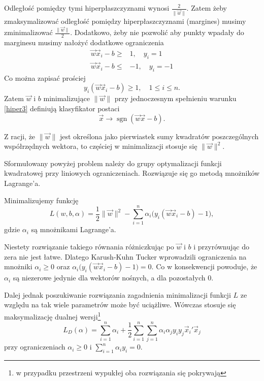 \documentclass[
]{book}
\theoremstyle{plain}
\theoremstyle{definition}
\theoremstyle{definition}
\theoremstyle{definition}
\theoremstyle{definition}
\theoremstyle{definition}
\theoremstyle{remark}
\begin{document}
Odległość pomiędzy tymi hiperpłaszczyznami wynosi \(\tfrac{2}{\|\vec{w}\|}\). Zatem żeby zmaksymalizować odległość pomiędzy hiperpłaszczyznami (margines) musimy zminimalizować \(\tfrac{\|\vec{w}\|}{2}\).
Dodatkowo, żeby nie pozwolić aby punkty wpadały do marginesu musimy nałożyć dodatkowe ograniczenia
\begin{align}
    \vec{w}\vec{x}_i-b\geq& 1, \quad   y_i=1\\
    \vec{w}\vec{x}_i-b\leq& -1, \quad y_i=-1
    \label{eq:hiper2}
\end{align}
Co można zapisać prościej
\begin{equation}
    y_i(\vec{w}\vec{x}_i-b)\geq 1,\quad 1\leq i\leq n.
    \label{eq:hiper3}
\end{equation}
Zatem \(\vec{w}\) i \(b\) minimalizujące \(\|\vec{w}\|\) przy jednoczesnym spełnieniu warunku \eqref{hiper3} definiują klasyfikator postaci
\begin{equation}
    \vec{x}\rightarrow \operatorname{sgn}(\vec{w}\vec{x}-b).
    \label{eq:hiper4}
\end{equation}

Z racji, że \(\|\vec{w}\|\) jest określona jako pierwiastek sumy kwadratów poszczególnych współrzędnych wektora, to częściej w minimalizacji stosuje się \(\|\vec{w}\|^2\).

Sformułowany powyżej problem należy do grupy optymalizacji funkcji kwadratowej przy liniowych ograniczeniach. Rozwiązuje się go metodą mnożników Lagrange'a.

Minimalizujemy funkcję
\begin{equation}
    L(w, b, \alpha) = \frac{1}{2}\|\vec{w}\|^2-\sum_{i=1}^{n}\alpha_i\big(y_i(\vec{w}\vec{x}_i-b)-1\big),
    \label{eq:lagrange}
\end{equation}
gdzie \(\alpha_i\) są mnożnikami Lagrange'a.

Niestety rozwiązanie takiego równania różniczkując po \(\vec{w}\) i \(b\) i przyrównując do zera nie jest łatwe. Dlatego Karush-Kuhn Tucker wprowadzili ograniczenia na mnożniki \(\alpha_i\geq 0\) oraz \(\alpha_i\big(y_i(\vec{w}\vec{x}_i-b)-1\big)=0\). Co w konsekwencji powoduje, że \(\alpha_i\) są niezerowe jedynie dla wektorów nośnych, a dla pozostałych 0.

Dalej jednak poszukiwanie rozwiązania zagadnienia minimalizacji funkcji \(L\) ze względu na tak wiele parametrów może być uciążliwe. Wówczas stosuje się maksymalizację dualnej wersji\footnote{w przypadku przestrzeni wypukłej oba rozwiązania się pokrywają}
\begin{equation}
    L_D(\alpha) = \sum_{i=1}^{n}\alpha_i+\frac{1}{2}\sum_{i=1}^{n}\sum_{j=1}^{n}\alpha_i\alpha_jy_iy_j\vec{x}_i'\vec{x}_j
    \label{eq:lagrange2}
\end{equation}
przy ograniczeniach \(\alpha_i\geq 0\) i \(\sum_{i=1}^{n}\alpha_iy_i=0\).
\end{document}
